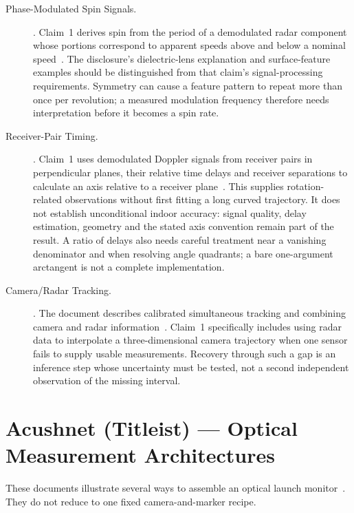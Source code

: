 \begin{description}
\item[Phase-Modulated Spin Signals.]
.
Claim~1 derives spin from the period of a demodulated radar component
whose portions correspond to apparent speeds above and below a nominal
speed~\cite{us9868044}. The disclosure's dielectric-lens explanation and
surface-feature examples should be distinguished from that claim's
signal-processing requirements. Symmetry can cause a feature pattern to
repeat more than once per revolution; a measured modulation frequency
therefore needs interpretation before it becomes a spin rate.
\item[Receiver-Pair Timing.]
.
Claim~1 uses demodulated Doppler signals from receiver pairs in
perpendicular planes, their relative time delays and receiver separations
to calculate an axis relative to a receiver plane~\cite{us10775492}.
This supplies rotation-related observations without first fitting a
long curved trajectory. It does not establish unconditional indoor
accuracy: signal quality, delay estimation, geometry and the stated axis
convention remain part of the result. A ratio of delays also needs
careful treatment near a vanishing denominator and when resolving angle
quadrants; a bare one-argument arctangent is not a complete implementation.
\item[Camera/Radar Tracking.]
.
The document describes calibrated simultaneous tracking and combining
camera and radar information~\cite{us10338209}. Claim~1 specifically
includes using radar data to interpolate a three-dimensional camera
trajectory when one sensor fails to supply usable measurements. Recovery
through such a gap is an inference step whose uncertainty must be tested,
not a second independent observation of the missing interval.
\end{description}

\section{Acushnet (Titleist) --- Optical Measurement Architectures}
\label{sec:patentacushnet}

These documents illustrate several ways to assemble an optical launch monitor~\cite{us5501463,us6500073,us6758759}.
They do not reduce to one fixed camera-and-marker recipe.

